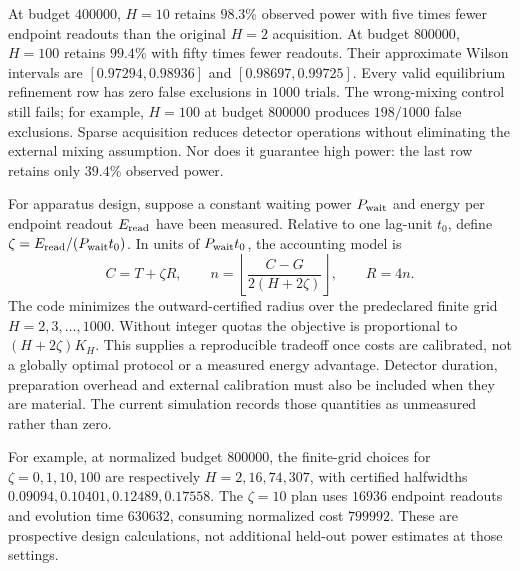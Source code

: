 At budget $400000$, $H=10$ retains $98.3\%$ observed power with five times
fewer endpoint readouts than the original $H=2$ acquisition. At budget
$800000$, $H=100$ retains $99.4\%$ with fifty times fewer readouts. Their
approximate Wilson intervals are $[0.97294,0.98936]$ and
$[0.98697,0.99725]$. Every valid equilibrium refinement row has zero false
exclusions in $1000$ trials. The wrong-mixing control still fails; for example,
$H=100$ at budget $800000$ produces $198/1000$ false exclusions. Sparse
acquisition reduces detector operations without eliminating the external
mixing assumption. Nor does it guarantee high power: the last row retains
only $39.4\%$ observed power.

For apparatus design, suppose a constant waiting power $P_{\rm wait}$ and
energy per endpoint readout $E_{\rm read}$ have been measured. Relative to
one lag-unit $t_0$, define
$\zeta=E_{\rm read}/(P_{\rm wait}t_0)$. In units of $P_{\rm wait}t_0$,
the accounting model is
\begin{equation}
 C=T+\zeta R,\qquad
 n=\left\lfloor\frac{C-G}{2(H+2\zeta)}\right\rfloor,
 \qquad R=4n.
 \label{eq:ci-readout-cost}
\end{equation}
The code minimizes the outward-certified radius over the predeclared finite
grid $H=2,3,\ldots,1000$. Without integer quotas the objective is proportional
to $(H+2\zeta)K_H$. This supplies a reproducible tradeoff once costs are
calibrated, not a globally optimal protocol or a measured energy advantage.
Detector duration, preparation overhead and external calibration must also
be included when they are material. The current simulation records those
quantities as unmeasured rather than zero.

For example, at normalized budget $800000$, the finite-grid choices for
$\zeta=0,1,10,100$ are respectively $H=2,16,74,307$, with certified
halfwidths $0.09094,0.10401,0.12489,0.17558$. The $\zeta=10$ plan uses
$16936$ endpoint readouts and evolution time $630632$, consuming normalized
cost $799992$. These are prospective design calculations, not additional
held-out power estimates at those settings.

